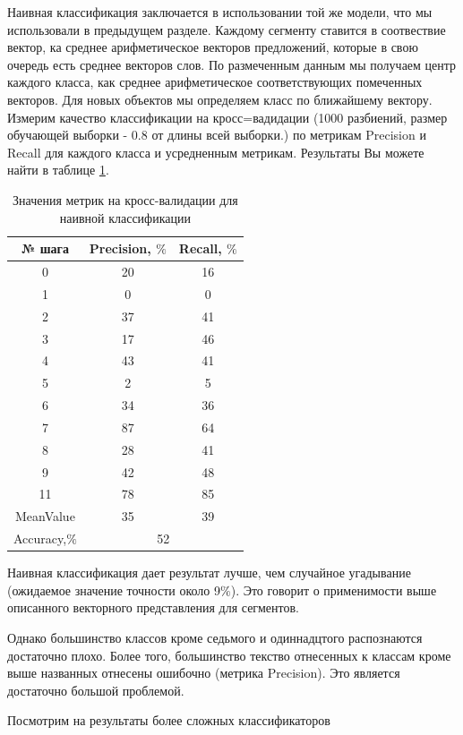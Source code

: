 \documentclass[12pt]{article}
\begin{document}
Наивная классификация заключается в использовании той же модели, что мы использовали в предыдущем разделе. Каждому сегменту ставится в соотвествие вектор, ка среднее арифметическое векторов предложений, которые в свою очередь есть среднее векторов слов. По размеченным данным мы получаем центр каждого класса, как среднее арифметическое соответствующих помеченных векторов. Для новых объектов мы определяем класс по ближайшему вектору. Измерим качество классификации на кросс=вадидации (1000 разбиений, размер обучающей выборки - 0.8 от длины всей выборки.) по метрикам Precision и Recall для каждого класса и усредненным метрикам. Результаты Вы можете найти в таблице \ref{table:naive}.

\begin{table}[h!]
\centering
\begin{tabular}{||c|c|c||}
\hline
№ шага &  Precision, $\%$ &Recall, $\%$ \\
\hline
0 &	20 &	16 \\
\hline
1 &	0 &	0 \\
\hline
2&	37 &	41 \\
\hline
3 &	17 &	46 \\
\hline
4 &	43 &	41 \\
\hline
5 &	2 &	5 \\
\hline
6 &	34 &	36 \\
\hline
7 &	87 &	64 \\
\hline
8 &	28 &	41 \\
\hline
9 &	42 &	48 \\
\hline
11 &	78 &	85 \\
\hline
MeanValue&35&39\\
\hline
Accuracy,$\%$&  \multicolumn{2}{c|}{52}\\
\hline
\end{tabular}
\caption{Значения метрик на кросс-валидации для наивной классификации}
\label{table:naive}
\end{table}

Наивная классификация дает результат лучше, чем случайное угадывание (ожидаемое значение точности около 9$\%$). Это говорит о применимости выше описанного векторного представления для сегментов.

Однако большинство классов кроме седьмого и одиннадцтого распознаются достаточно плохо. Более того, большинство текство отнесенных к классам кроме выше названных отнесены ошибочно (метрика Precision). Это является достаточно большой проблемой.

Посмотрим на результаты более сложных классификаторов
\end{document}
